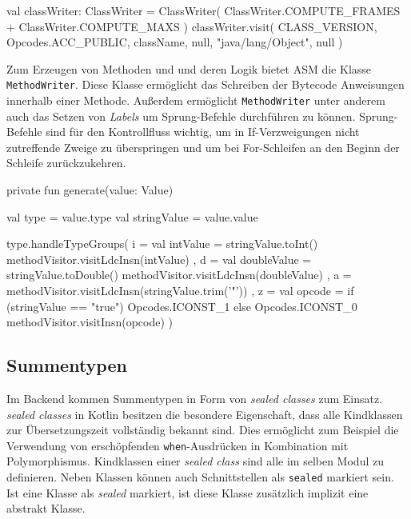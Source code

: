 \begin{KotlinCode}[numbers=none, caption={ASM Code zum Erstellen der Klasse, welche ein \toya Programm definiert.}]
val classWriter: ClassWriter = ClassWriter(
    ClassWriter.COMPUTE_FRAMES + ClassWriter.COMPUTE_MAXS
)
classWriter.visit(
    CLASS_VERSION,
    Opcodes.ACC_PUBLIC,
    className,
    null,
    "java/lang/Object",
    null
)
\end{KotlinCode}

Zum Erzeugen von Methoden und und deren Logik bietet ASM die Klasse \texttt{MethodWriter}. Diese Klasse ermöglicht das Schreiben der Bytecode Anweisungen innerhalb einer Methode. Außerdem ermöglicht \texttt{MethodWriter} unter anderem auch das Setzen von \textit{Labels} um Sprung-Befehle durchführen zu können. Sprung-Befehle sind für den Kontrollfluss wichtig, um in If-Verzweigungen nicht zutreffende Zweige zu überspringen und um bei For-Schleifen an den Beginn der Schleife zurückzukehren.

\begin{KotlinCode}[numbers=none, caption={\texttt{generate()} Funktion, welche Wert-Literale erzeugt.}]
private fun generate(value: Value) {
    val type = value.type
    val stringValue = value.value

    type.handleTypeGroups(
        i = {
            val intValue = stringValue.toInt()
            methodVisitor.visitLdcInsn(intValue)
        },
        d = {
            val doubleValue = stringValue.toDouble()
            methodVisitor.visitLdcInsn(doubleValue)
        },
        a = { methodVisitor.visitLdcInsn(stringValue.trim('"')) },
        z = {
            val opcode = if (stringValue == "true") Opcodes.ICONST_1 else Opcodes.ICONST_0
            methodVisitor.visitInsn(opcode)
        }
    )
}
\end{KotlinCode}

\subsection{Summentypen}

Im Backend kommen Summentypen in Form von \textit{sealed classes} zum Einsatz. \textit{sealed classes} in Kotlin besitzen die besondere Eigenschaft, dass alle Kindklassen zur Übersetzungszeit vollständig bekannt sind. Dies ermöglicht zum Beispiel die Verwendung von erschöpfenden \texttt{when}-Ausdrücken in Kombination mit Polymorphismus. Kindklassen einer \textit{sealed class} sind alle im selben Modul zu definieren. Neben Klassen können auch Schnittstellen als \texttt{sealed} markiert sein. Ist eine Klasse als \textit{sealed} markiert, ist diese Klasse zusätzlich implizit eine abstrakt Klasse.

